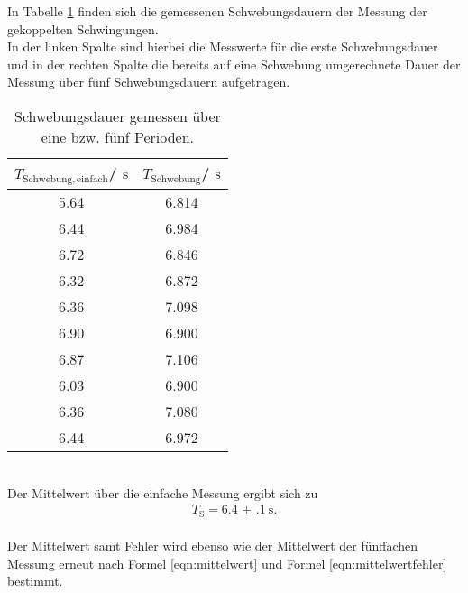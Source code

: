 In Tabelle \ref{tab:schwebung} finden sich die gemessenen Schwebungsdauern der Messung der gekoppelten Schwingungen.\\
In der linken Spalte sind hierbei die Messwerte für die erste Schwebungsdauer und in der rechten Spalte die bereits auf eine Schwebung umgerechnete Dauer der Messung über fünf Schwebungsdauern aufgetragen.
\begin{table}
	\centering
	\caption{Schwebungsdauer gemessen über eine bzw. fünf Perioden.}
	\label{tab:schwebung}
	\begin{tabular}{cc}
		\toprule
		$T_{\mathrm{Schwebung, einfach}}$/ $\si{\second}$ & $T_{\mathrm{Schwebung}}$/ $\si{\second}$ \\
		\midrule
		5.64                                              & 6.814                                    \\
		6.44                                              & 6.984                                    \\
		6.72                                              & 6.846                                    \\
		6.32                                              & 6.872                                    \\
		6.36                                              & 7.098                                    \\
		6.90                                              & 6.900                                    \\
		6.87                                              & 7.106                                    \\
		6.03                                              & 6.900                                    \\
		6.36                                              & 7.080                                    \\
		6.44                                              & 6.972                                    \\
		\bottomrule
	\end{tabular}
\end{table}
\\Der Mittelwert über die einfache Messung ergibt sich zu
\begin{align*}
	T_{\mathrm{S}}=\SI{6.4(1)}{\second} \text{.}
\end{align*}
\\Der Mittelwert samt Fehler wird ebenso wie der Mittelwert der fünffachen Messung erneut nach Formel \eqref{eqn:mittelwert} und Formel \eqref{eqn:mittelwertfehler} bestimmt.

